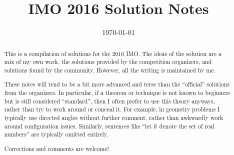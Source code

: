 \documentclass[11pt]{scrartcl}
\title{IMO 2016 Solution Notes}
\date{\today}
\begin{document}
\maketitle

\begin{abstract}
This is a compilation of solutions
for the 2016 IMO.
The ideas of the solution are a mix of my own work,
the solutions provided by the competition organizers,
and solutions found by the community.
However, all the writing is maintained by me.

These notes will tend to be a bit more advanced and terse than the ``official''
solutions from the organizers.
In particular, if a theorem or technique is not known to beginners
but is still considered ``standard'', then I often prefer to
use this theory anyways, rather than try to work around or conceal it.
For example, in geometry problems I typically use directed angles
without further comment, rather than awkwardly work around configuration issues.
Similarly, sentences like ``let $\mathbb{R}$ denote the set of real numbers''
are typically omitted entirely.

Corrections and comments are welcome!
\end{abstract}

\tableofcontents
\newpage

\addtocounter{section}{-1}
\end{document}
